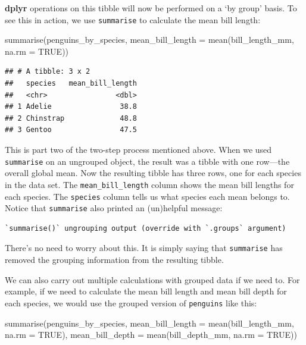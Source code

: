 \documentclass[
]{book}
\newenvironment{Shaded}{\begin{snugshade}}{\end{snugshade}}
\newcommand{\AttributeTok}[1]{\textcolor[rgb]{0.77,0.63,0.00}{#1}}
\newcommand{\ConstantTok}[1]{\textcolor[rgb]{0.00,0.00,0.00}{#1}}
\newcommand{\FunctionTok}[1]{\textcolor[rgb]{0.00,0.00,0.00}{#1}}
\newcommand{\NormalTok}[1]{#1}
\begin{document}
\textbf{dplyr} operations on this tibble will now be performed on a `by group' basis. To see this in action, we use \texttt{summarise} to calculate the mean bill length:

\begin{Shaded}
\begin{Highlighting}[]
\FunctionTok{summarise}\NormalTok{(penguins\_by\_species, }
          \AttributeTok{mean\_bill\_length =} \FunctionTok{mean}\NormalTok{(bill\_length\_mm, }\AttributeTok{na.rm =} \ConstantTok{TRUE}\NormalTok{))}
\end{Highlighting}
\end{Shaded}

\begin{verbatim}
## # A tibble: 3 x 2
##   species   mean_bill_length
##   <chr>                <dbl>
## 1 Adelie                38.8
## 2 Chinstrap             48.8
## 3 Gentoo                47.5
\end{verbatim}

This is part two of the two-step process mentioned above. When we used \texttt{summarise} on an ungrouped object, the result was a tibble with one row---the overall global mean. Now the resulting tibble has three rows, one for each species in the data set. The \texttt{mean\_bill\_length} column shows the mean bill lengths for each species. The \texttt{species} column tells us what species each mean belongs to. Notice that \texttt{summarise} also printed an (un)helpful message:

\begin{verbatim}
`summarise()` ungrouping output (override with `.groups` argument)
\end{verbatim}

There's no need to worry about this. It is simply saying that \texttt{summarise} has removed the grouping information from the resulting tibble.

We can also carry out multiple calculations with grouped data if we need to. For example, if we need to calculate the mean bill length and mean bill depth for each species, we would use the grouped version of \texttt{penguins} like this:

\begin{Shaded}
\begin{Highlighting}[]
\FunctionTok{summarise}\NormalTok{(penguins\_by\_species, }
          \AttributeTok{mean\_bill\_length =} \FunctionTok{mean}\NormalTok{(bill\_length\_mm, }\AttributeTok{na.rm =} \ConstantTok{TRUE}\NormalTok{),}
          \AttributeTok{mean\_bill\_depth  =} \FunctionTok{mean}\NormalTok{(bill\_depth\_mm,  }\AttributeTok{na.rm =} \ConstantTok{TRUE}\NormalTok{))}
\end{Highlighting}
\end{Shaded}
\end{document}

